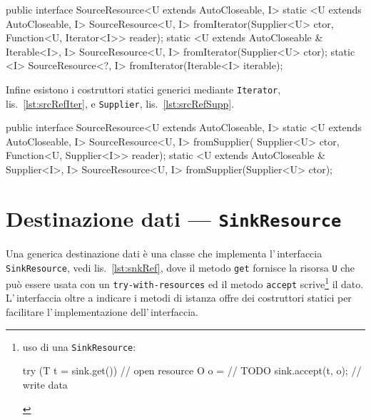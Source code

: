 \begin{elisting}[!htb]
\begin{javacode}
public interface SourceResource<U extends AutoCloseable, I> {
    static <U extends AutoCloseable, I> SourceResource<U, I> fromIterator(Supplier<U> ctor,
                                                                          Function<U, Iterator<I>> reader);
    static <U extends AutoCloseable & Iterable<I>, I> SourceResource<U, I> fromIterator(Supplier<U> ctor);
    static <I> SourceResource<?, I> fromIterator(Iterable<I> iterable);
}
\end{javacode}
\caption{Metodi per creare una origine dati da un iterator}
\label{lst:srcRefIter}
\end{elisting}
Infine esistono i costruttori statici generici mediante \texttt{Iterator},
lis.~\ref{lst:srcRefIter}, e \texttt{Supplier}, lis.~\ref{lst:srcRefSupp}.

\begin{elisting}[!htb]
\begin{javacode}
public interface SourceResource<U extends AutoCloseable, I> {
    static <U extends AutoCloseable, I> SourceResource<U, I> fromSupplier(
        Supplier<U> ctor, Function<U, Supplier<I>> reader);
    static <U extends AutoCloseable & Supplier<I>, I> SourceResource<U, I> fromSupplier(Supplier<U> ctor);
}
\end{javacode}
\caption{Metodi per creare una origine dati da un supplier}
\label{lst:srcRefSupp}
\end{elisting}


\section{Destinazione dati --- \texttt{SinkResource}} \label{sec:snkRes}
Una generica destinazione dati è una classe che implementa l'\,interfaccia
\texttt{SinkResource}, vedi lis.~\ref{lst:snkRef}, dove il metodo \texttt{get}
fornisce la risorsa \texttt{U} che può essere usata con un
\texttt{try-with-resources} ed il metodo \texttt{accept} scrive\footnote{%
    uso di una \texttt{SinkResource}:
    \begin{javacode}
        try (T t = sink.get()) {    // open resource
        O o = // TODO
        sink.accept(t, o);      // write data
    }
    \end{javacode}
} il dato.
L'\,interfaccia oltre a indicare i metodi di istanza offre dei costruttori
statici per facilitare l'\,implementazione dell'\,interfaccia.


